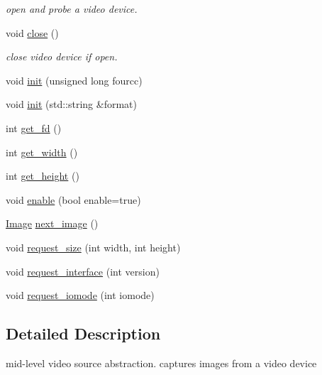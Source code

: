 \begin{DoxyCompactItemize}
\begin{DoxyCompactList}\small\item\em open and probe a video device. \end{DoxyCompactList}\item 
\hypertarget{classzbar_1_1_video_aae0c7edee012d77e2f717a836d2e5cd8}{
void \hyperlink{classzbar_1_1_video_aae0c7edee012d77e2f717a836d2e5cd8}{close} ()}
\label{classzbar_1_1_video_aae0c7edee012d77e2f717a836d2e5cd8}

\begin{DoxyCompactList}\small\item\em close video device if open. \end{DoxyCompactList}\item 
void \hyperlink{classzbar_1_1_video_a60303296432af700de577e1df27fd6e5}{init} (unsigned long fourcc)
\item 
void \hyperlink{classzbar_1_1_video_a869dbf8aa9b7d12b7b31214d897a0365}{init} (std::string \&format)
\item 
int \hyperlink{classzbar_1_1_video_a8c2907f8bc1a4c84d3f7209ce6ef947d}{get\_\-fd} ()
\item 
int \hyperlink{classzbar_1_1_video_ae5d3af6376e49ed2feda4d1115cf72cc}{get\_\-width} ()
\item 
int \hyperlink{classzbar_1_1_video_ac7d976478166c917b654029c444d7a97}{get\_\-height} ()
\item 
void \hyperlink{classzbar_1_1_video_abb3c3a772bd974c0304ee23b958b25dc}{enable} (bool enable=true)
\item 
\hyperlink{classzbar_1_1_image}{Image} \hyperlink{classzbar_1_1_video_afaeb0e02ccb2e48a03d9b2e3fa8153b0}{next\_\-image} ()
\item 
void \hyperlink{classzbar_1_1_video_ad54651f0c6567fc930418b47ddda43d6}{request\_\-size} (int width, int height)
\item 
void \hyperlink{classzbar_1_1_video_a537acda75d9567c2dc13462244522046}{request\_\-interface} (int version)
\item 
void \hyperlink{classzbar_1_1_video_ab5c177a8961893afdb79d68f34290ec8}{request\_\-iomode} (int iomode)
\end{DoxyCompactItemize}


\subsection{Detailed Description}
mid-\/level video source abstraction. captures images from a video device 

